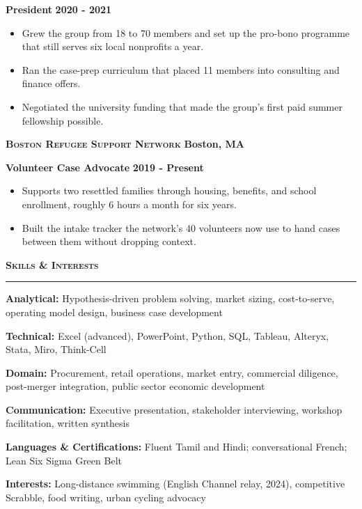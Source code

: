 \documentclass{article}
\newcommand{\vs}{\vspace{0.3cm}}
\begin{document}
\noindent \textbf{President} \hfill \textbf{2020 - 2021}
\begin{itemize}
	\item Grew the group from 18 to 70 members and set up the pro-bono programme that still serves six local nonprofits a year.
	\item Ran the case-prep curriculum that placed 11 members into consulting and finance offers.
	\item Negotiated the university funding that made the group's first paid summer fellowship possible.
\end{itemize}

\noindent \textbf{\textsc{Boston Refugee Support Network}} \hfill \textbf{Boston, MA}

\noindent \textbf{Volunteer Case Advocate} \hfill \textbf{2019 - Present}
\begin{itemize}
	\item Supports two resettled families through housing, benefits, and school enrollment, roughly 6 hours a month for six years.
	\item Built the intake tracker the network's 40 volunteers now use to hand cases between them without dropping context.
\end{itemize}
\vs

\noindent \textbf{\textsc{\large Skills \& Interests}}

\noindent \rule[3pt]{\textwidth}{1pt}

\noindent \textbf{Analytical:} Hypothesis-driven problem solving, market sizing, cost-to-serve, operating model design, business case development

\noindent \textbf{Technical:} Excel (advanced), PowerPoint, Python, SQL, Tableau, Alteryx, Stata, Miro, Think-Cell

\noindent \textbf{Domain:} Procurement, retail operations, market entry, commercial diligence, post-merger integration, public sector economic development

\noindent \textbf{Communication:} Executive presentation, stakeholder interviewing, workshop facilitation, written synthesis

\noindent \textbf{Languages \& Certifications:} Fluent Tamil and Hindi; conversational French; Lean Six Sigma Green Belt

\noindent \textbf{Interests:} Long-distance swimming (English Channel relay, 2024), competitive Scrabble, food writing, urban cycling advocacy
\end{document}
